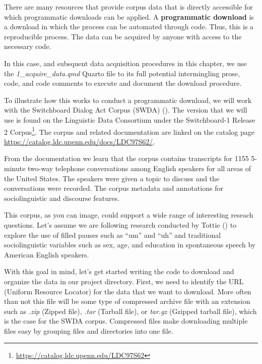\documentclass[
  letterpaper,
  DIV=11,
  numbers=noendperiod]{scrreprt}
\theoremstyle{definition}
\theoremstyle{remark}
\DeclareRobustCommand{\href}[2]{#2\footnote{\url{#1}}}
\begin{document}
There are many resources that provide corpus data that is directly
accessible for which programmatic downloads can be applied. A
\textbf{programmatic download} is a download in which the process can be
automated through code. Thus, this is a reproducible process. The data
can be acquired by anyone with access to the necessary code.

In this case, and subsquent data acquisition procedures in this chapter,
we use the \emph{1\_acquire\_data.qmd} Quarto file to its full potential
intermingling prose, code, and code comments to execute and document the
download procedure.

To illustrate how this works to conduct a programmatic download, we will
work with the Switchboard Dialog Act Corpus (SWDA)
(). The
version that we will use is found on the Linguistic Data Consortium
under the \href{https://catalog.ldc.upenn.edu/LDC97S62}{Switchboard-1
Release 2 Corpus}. The corpus and related documentation are linked on
the catalog page \url{https://catalog.ldc.upenn.edu/docs/LDC97S62/}.

From the documentation we learn that the corpus contains transcripts for
1155 5-minute two-way telephone conversations among English speakers for
all areas of the United States. The speakers were given a topic to
discuss and the conversations were recorded. The corpus metadata and
annotations for sociolinguistic and discourse features.

This corpus, as you can image, could support a wide range of interesting
reseach questions. Let's assume we are following research conducted by
Tottie () to explore the use of filled
pauses such as ``um'' and ``uh'' and traditional sociolinguistic
variables such as sex, age, and education in spontaneous speech by
American English speakers.

With this goal in mind, let's get started writing the code to download
and organize the data in our project directory. First, we need to
identify the URL (Uniform Resource Locator) for the data that we want to
download. More often than not this file will be some type of compressed
archive file with an extension such as \emph{.zip} (Zipped file),
\emph{.tar} (Tarball file), or \emph{tar.gz} (Gzipped tarball file),
which is the case for the SWDA corpus. Compressed files make downloading
multiple files easy by grouping files and directories into one file.
\end{document}
